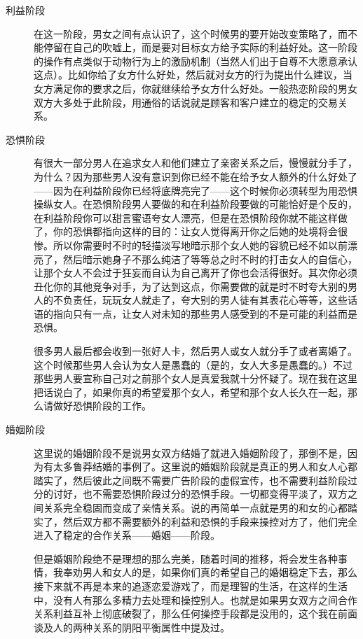 \documentclass[11pt,oneside]{article}
\begin{document}
\begin{common-format}
\begin{description}
\item[利益阶段] 在这一阶段，男女之间有点认识了，这个时候男的要开始改变策略了，而不能停留在自己的吹嘘上，而是要对目标女方给予实际的利益好处。这一阶段的操作有点类似于动物行为上的激励机制（当然人们出于自尊不大愿意承认这点）。比如你给了女方什么好处，然后就对女方的行为提出什么建议，当女方满足你的要求之后，你就继续给予女方什么好处。一般热恋阶段的男女双方大多处于此阶段，用通俗的话说就是顾客和客户建立的稳定的交易关系。

\item[恐惧阶段] 有很大一部分男人在追求女人和他们建立了亲密关系之后，慢慢就分手了，为什么？因为那些男人没有意识到你已经不能在给予女人额外的什么好处了——因为在利益阶段你已经将底牌亮完了——这个时候你必须转型为用恐惧操纵女人。在恐惧阶段男人要做的和在利益阶段要做的可能恰好是个反的，在利益阶段你可以甜言蜜语夸女人漂亮，但是在恐惧阶段你就不能这样做了，你的恐惧都指向这样的目的：让女人觉得离开你之后她的处境将会很惨。所以你需要时不时的轻描淡写地暗示那个女人她的容貌已经不如以前漂亮了，然后暗示她身子不那么纯洁了等等总之时不时的打击女人的自信心，让那个女人不会过于狂妄而自认为自己离开了你也会活得很好。其次你必须丑化你的其他竞争对手，为了达到这点，你需要做的就是时不时夸大别的男人的不负责任，玩玩女人就走了，夸大别的男人徒有其表花心等等，这些话语的指向只有一点，让女人对未知的那些男人感受到的不是可能的利益而是恐惧。

很多男人最后都会收到一张好人卡，然后男人或女人就分手了或者离婚了。这个时候那些男人会认为女人是愚蠢的（是的，女人大多是愚蠢的。）不过那些男人要宣称自己对之前那个女人是真爱我就十分怀疑了。现在我在这里把话说白了，如果你真的希望爱那个女人，希望和那个女人长久在一起，那么请做好恐惧阶段的工作。

\item[婚姻阶段] 这里说的婚姻阶段不是说男女双方结婚了就进入婚姻阶段了，那倒不是，因为有太多鲁莽结婚的事例了。这里说的婚姻阶段就是真正的男人和女人心都踏实了，然后彼此之间既不需要广告阶段的虚假宣传，也不需要利益阶段过分的讨好，也不需要恐惧阶段过分的恐惧手段。一切都变得平淡了，双方之间关系完全稳固而变成了亲情关系。说的再简单一点就是男的和女的心都踏实了，然后双方都不需要额外的利益和恐惧的手段来操控对方了，他们完全进入了稳定的合作关系——婚姻——阶段。

但是婚姻阶段绝不是理想的那么完美，随着时间的推移，将会发生各种事情，我奉劝男人和女人的是，如果你们真的希望自己的婚姻稳定下去，那么接下来就不再是本来的追逐恋爱游戏了，而是理智的生活，在这样的生活中，没有人有那么多精力去处理和操控别人。也就是如果男女双方之间合作关系利益互补上彻底破裂了，那么任何操控手段都是没用的，这个我在前面谈及人的两种关系的阴阳平衡属性中提及过。
\end{description}



\end{common-format}
\end{document}

